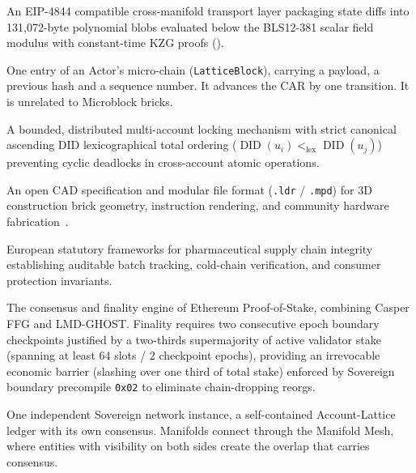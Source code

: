\documentclass[a4paper,11pt,twoside,parskip=half-,headings=small]{scrartcl}
\newcommand{\code}[1]{\texttt{#1}}
\begin{document}
\begin{description}[style=nextline,leftmargin=1.5em]
  \item[\hypertarget{glossary:kzg_relay}{\textbf{KZG Blob Relay}} (\cref{sec:manifold_meshing})] An EIP-4844 compatible cross-manifold transport layer packaging state diffs into 131,072-byte polynomial blobs evaluated below the BLS12-381 scalar field modulus with constant-time KZG proofs ().
  \item[\hypertarget{glossary:lattice_block}{\textbf{Lattice Block}} (\cref{sec:car})] One entry of an Actor's micro-chain (\code{LatticeBlock}), carrying a payload, a previous hash and a sequence number. It advances the CAR by one transition. It is unrelated to Microblock bricks.
  \item[\hypertarget{glossary:saga}{\textbf{Lattice Saga Protocol}} (\cref{sec:saga_locking})] A bounded, distributed multi-account locking mechanism with strict canonical ascending DID lexicographical total ordering ($\operatorname{DID}(u_i) <_{\text{lex}} \operatorname{DID}(u_j)$) preventing cyclic deadlocks in cross-account atomic operations.
  \item[\hypertarget{glossary:ldraw}{\textbf{LDraw}} (\cref{sec:tinyblock_ldraw})] An open CAD specification and modular file format (\code{.ldr} / \code{.mpd}) for 3D construction brick geometry, instruction rendering, and community hardware fabrication~\cite{ldraw2020}.
  \item[\hypertarget{glossary:gmp}{\textbf{EU-GMP / Statutory Compliance API}} (\cref{sec:statutory_compliance})] European statutory frameworks for pharmaceutical supply chain integrity establishing auditable batch tracking, cold-chain verification, and consumer protection invariants.
  \item[\hypertarget{glossary:gasper}{\textbf{Gasper Finality}} (\cref{sec:cross_chain_blind_notes}, \cref{sec:reorg_pathologies_and_probing})] The consensus and finality engine of Ethereum Proof-of-Stake, combining Casper FFG and LMD-GHOST. Finality requires two consecutive epoch boundary checkpoints justified by a two-thirds supermajority of active validator stake (spanning at least 64 slots / 2 checkpoint epochs), providing an irrevocable economic barrier (slashing over one third of total stake) enforced by Sovereign boundary precompile \code{0x02} to eliminate chain-dropping reorgs.
  \item[\hypertarget{glossary:manifold}{\textbf{Manifold}} (\cref{sec:manifold_meshing})] One independent Sovereign network instance, a self-contained Account-Lattice ledger with its own consensus. Manifolds connect through the Manifold Mesh, where entities with visibility on both sides create the overlap that carries consensus.

\end{description}
\end{document}

